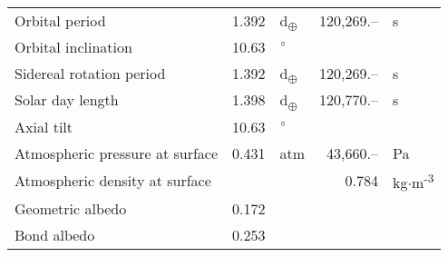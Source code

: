 \begin{tabular}{|p{4cm}|r l|r l|}
  Orbital period & 1.392 & d\textsubscript{$\oplus$} & 120,269.-- & s \\
  Orbital inclination & 10.63 & $\degree$ & & \\
  Sidereal rotation period & 1.392 & d\textsubscript{$\oplus$} & 120,269.-- & s \\
  Solar day length & 1.398 & d\textsubscript{$\oplus$} & 120,770.-- & s \\
  Axial tilt & 10.63 & $\degree$ & & \\
  Atmospheric pressure at surface & 0.431 & atm & 43,660.-- & Pa \\
  Atmospheric density at surface & & & 0.784 & kg$\cdot$m\textsuperscript{-3} \\
  Geometric albedo & 0.172 & & & \\
  Bond albedo & 0.253 & & & \\
  \hline
\end{tabular}
\newpage
